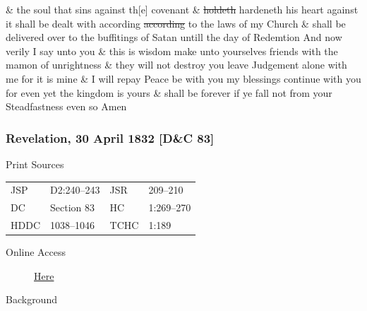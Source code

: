 \& the soul that sins against th[e] covenant \& \sout{holdeth} hardeneth his heart against it shall be dealt with according \sout{according} to the laws of my Church \& shall be delivered over to the buffitings of Satan untill the day of Redemtion And now verily I say unto you \& this is wisdom make unto yourselves friends with the mamon of unrightness \& they will not destroy you leave Judgement alone with me for it is mine \& I will repay Peace be with you my blessings continue with you for even yet the kingdom is yours \& shall be forever if ye fall not from your Steadfastness even so Amen
				
		\subsubsection{Revelation, 30 April 1832 [D\&C 83]}
			\label{EMS-1832-JS-30-APR-1832}
		
			\begin{description}
				\item[Print Sources]
			\end{description}

				\begin{tabular}{p{0.5in}p{1in}p{0.5in}p{1in}}
				JSP	 	& D2:240--243	& JSR 		& 209--210 \\
				DC	 	& Section 83 	& HC 		& 1:269--270 \\
				HDDC 	& 1038--1046	& TCHC 		& 1:189 \\
				\end{tabular}
			
			\begin{description}
				\item[Online Access] \href{https://www.josephsmithpapers.org/paper-summary/revelation-30-april-1832-dc-83/1}{Here}
			\end{description}
			
			\begin{description}
				\item[Background]
			\end{description}
			
			
